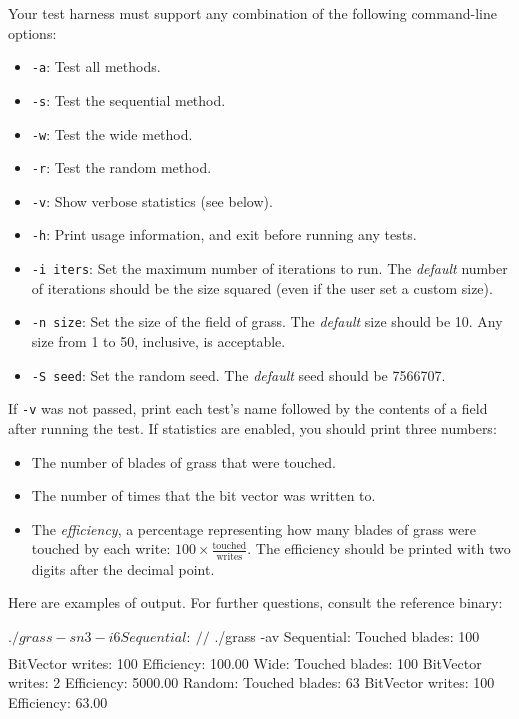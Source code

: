 \documentclass[11pt]{article}
\begin{document}
Your test harness must support any combination of the following command-line options:

\begin{itemize}
    \item \texttt{-a}: Test all methods.
    \item \texttt{-s}: Test the sequential method.
    \item \texttt{-w}: Test the wide method.
    \item \texttt{-r}: Test the random method.
    \item \texttt{-v}: Show verbose statistics (see below).
    \item \texttt{-h}: Print usage information, and exit before running any tests.
    \item \texttt{-i iters}: Set the maximum number of iterations to run. The \emph{default} number of iterations should be the size squared (even if the user set a custom size).
    \item \texttt{-n size}: Set the size of the field of grass. The \emph{default} size should be 10. Any size from 1 to 50, inclusive, is acceptable.
    \item \texttt{-S seed}: Set the random seed. The \emph{default} seed should be 7566707.
\end{itemize}

If \texttt{-v} was not passed, print each test's name followed by the contents of a field after running the test. If statistics are enabled, you should print three numbers:

\begin{itemize}
    \item The number of blades of grass that were touched.
    \item The number of times that the bit vector was written to.
    \item The \emph{efficiency}, a percentage representing how many blades of grass were touched by each write: $100 \times \frac{\text{touched}}{\text{writes}}$. The efficiency should be printed with two digits after the decimal point.
\end{itemize}

Here are examples of output. For further questions, consult the reference binary:

\begin{shlisting}{}
$ ./grass -sn 3 -i 6
Sequential:
___
___
///
$ ./grass -av
Sequential:
  Touched blades:     100
  BitVector writes:   100
  Efficiency:         100.00%
Wide:
  Touched blades:     100
  BitVector writes:     2
  Efficiency:        5000.00%
Random:
  Touched blades:      63
  BitVector writes:   100
  Efficiency:          63.00%
\end{shlisting}
\end{document}
